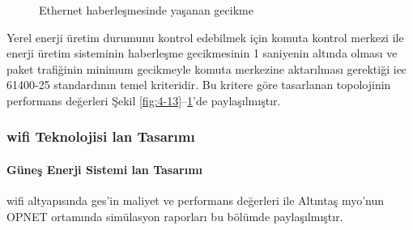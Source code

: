 \begin{figure}[htbp]

\centering

\caption{Ethernet haberleşmesinde yaşanan gecikme}
\label{fig:4-15}
\end{figure}

Yerel enerji üretim durumunu kontrol edebilmek için komuta kontrol merkezi ile enerji üretim sisteminin haberleşme gecikmesinin 1 saniyenin altında olması ve paket trafiğinin minimum gecikmeyle komuta merkezine aktarılması gerektiği \gls{iec} 61400-25 standardının temel kriteridir. Bu kritere göre tasarlanan topolojinin performans değerleri Şekil \ref{fig:4-13}--\ref{fig:4-15}’de paylaşılmıştır.
\newpage  %
\subsubsection{\gls{wifi} Teknolojisi \gls{lan} Tasarımı}\label{yerelWifi}

\paragraph{Güneş Enerji Sistemi \gls{lan} Tasarımı}

\gls{wifi} altyapısında \gls{ges}'in maliyet ve performans değerleri ile Altıntaş \gls{myo}’nun OPNET ortamında simülasyon raporları bu bölümde paylaşılmıştır.


